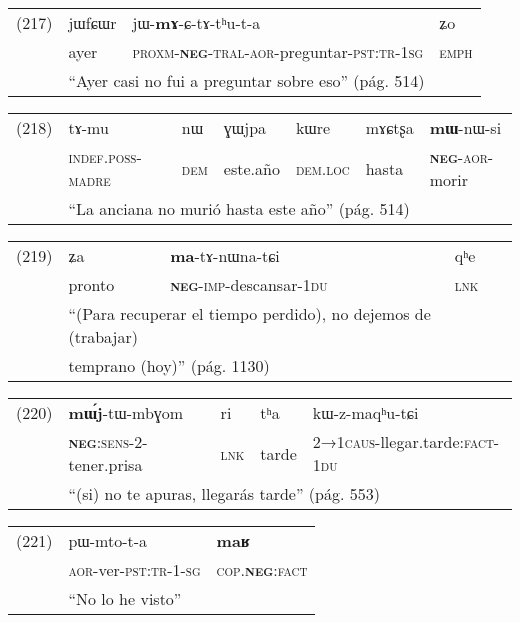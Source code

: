 {\setmainfont{Charis SIL} 

\noindent \begin{tabular}{llll}
(217) & jɯfɕɯr & jɯ-\textbf{mɤ}-ɕ-tɤ-tʰu-t-a & ʑo \\
& ayer & \textsc{proxm-\textbf{neg}-tral-aor-}preguntar-\textsc{pst:tr-1sg} & \textsc{emph} \\
& \multicolumn{3}{l}{``Ayer casi no fui a preguntar sobre eso'' (pág. 514)}
\end{tabular} \vspace{0.5cm}

\noindent \begin{tabular}{lllllll}
(218) & tɤ-mu & nɯ & ɣɯjpa & kɯre & mɤɕtʂa & \textbf{mɯ}-nɯ-si \\
& \textsc{indef.poss-madre} & \textsc{dem} & este.año &\textsc{dem.loc} & hasta & \textsc{\textbf{neg}-aor-}morir \\
& \multicolumn{6}{l}{``La anciana no murió hasta este año'' (pág. 514)}
\end{tabular} \vspace{0.5cm}

\noindent \begin{tabular}{llll}
(219) & ʑa & \textbf{ma}-tɤ-nɯna-tɕi & qʰe \\
& pronto & \textsc{\textbf{neg}-imp-}descansar-\textsc{1du} & \textsc{lnk}\\
& \multicolumn{3}{l}{``(Para recuperar el tiempo perdido), no dejemos de (trabajar)} \\ 
& \multicolumn{3}{l}{temprano (hoy)'' (pág. 1130)}
\end{tabular} \vspace{0.5cm}

\noindent \begin{tabular}{lllll}
(220) & \textbf{mɯ́j}-tɯ-mbɣom & ri & tʰa & kɯ-z-maqʰu-tɕi \\
& \textsc{\textbf{neg}:sens-2-}tener.prisa & \textsc{lnk} & tarde & \textsc{2→1caus-}llegar.tarde:\textsc{fact-1du} \\
& \multicolumn{4}{l}{``(si) no te apuras, llegarás tarde'' (pág. 553)}
\end{tabular} \vspace{0.5cm}

\noindent \begin{tabular}{lll}
(221) & pɯ-mto-t-a & \textbf{maʁ} \\
& \textsc{aor-}ver-\textsc{pst:tr-1-sg} & \textsc{cop.\textbf{neg}:fact} \\
& \multicolumn{2}{l}{``No lo he visto''}
\end{tabular} \vspace{0.5cm}

}


